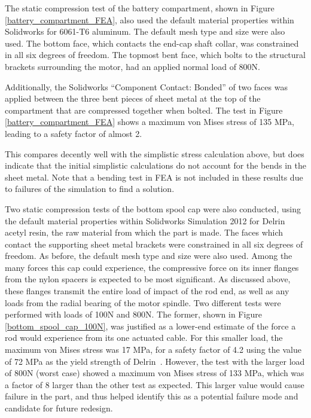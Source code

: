 \documentclass[12pt]{report}
\begin{document}
The static compression test of the battery compartment, shown in Figure \ref{battery_compartment_FEA}, also used the default material properties within Solidworks for 6061-T6 aluminum. 
The default mesh type and size were also used.
The bottom face, which contacts the end-cap shaft collar, was constrained in all six degrees of freedom.
The topmost bent face, which bolts to the structural brackets surrounding the motor, had an applied normal load of 800N.

Additionally, the Solidworks ``Component Contact: Bonded'' of two faces was applied between the three bent pieces of sheet metal at the top of the compartment that are compressed together when bolted.
The test in Figure \ref{battery_compartment_FEA} shows a maximum von Mises stress of 135 MPa, leading to a safety factor of almost 2.


This compares decently well with the simplistic stress calculation above, but does indicate that the initial simplistic calculations do not account for the bends in the sheet metal.
Note that a bending test in FEA is not included in these results due to failures of the simulation to find a solution.

Two static compression tests of the bottom spool cap were also conducted, using the default material properties within Solidworks Simulation 2012 for Delrin acetyl resin, the raw material from which the part is made.
The faces which contact the supporting sheet metal brackets were constrained in all six degrees of freedom. %
As before, the default mesh type and size were also used.
Among the many forces this cap could experience, the compressive force on its inner flanges from the nylon spacers is expected to be most significant.
As discussed above, these flanges transmit the entire load of impact of the rod end, as well as any loads from the radial bearing of the motor spindle.
Two different tests were performed with loads of 100N and 800N.
The former, shown in Figure \ref{bottom_spool_cap_100N}, was justified as a lower-end estimate of the force a rod would experience from its one actuated cable.
For this smaller load, the maximum von Mises stress was 17 MPa, for a safety factor of 4.2 using the value of 72 MPa as the yield strength of Delrin~\cite{Delrin2014}.
However, the test with the larger load of 800N (worst case) showed a maximum von Mises stress of 133 MPa, which was a factor of 8 larger than the other test as expected.
This larger value would cause failure in the part, and thus helped identify this as a potential failure mode and candidate for future redesign. \\
\end{document}
